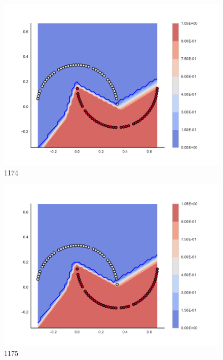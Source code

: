\begin{subfigure}[b]{0.09\textwidth}
    \includegraphics[clip, trim=2.35cm 1.75cm 4.5cm 0cm,width=\textwidth]{img/convergence/1174.pdf}
    \caption{1174}
    \label{fig:convergence_1174}
\end{subfigure}
%
\begin{subfigure}[b]{0.09\textwidth}
    \includegraphics[clip, trim=2.35cm 1.75cm 4.5cm 0cm,width=\textwidth]{img/convergence/1175.pdf}
    \caption{1175}
    \label{fig:convergence_1175}
\end{subfigure}
%
